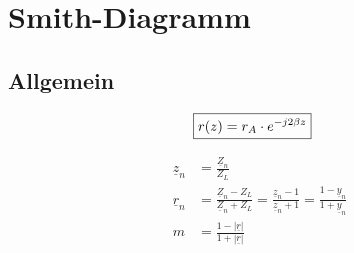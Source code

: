 \section{Smith-Diagramm}

\subsection{Allgemein}
\begin{center}
    \begin{align*}
        \Aboxed{r(z) & = r_A \cdot e^{-j2\beta z}}
    \end{align*}
    
\end{center}
\begin{align*}
    \underline{z}_n & = \frac{\underline{Z}_n}{Z_L}                                                                                                                   \\
    \underline{r}_n   & = \frac{\underline{Z}_n-Z_L}{\underline{Z}_n+Z_L}= \frac{\underline{z}_n-1}{\underline{z}_n+1}    = \frac{1-\underline{y}_n}{1+\underline{y}_n} \\
    m               & = \frac{1-|\underline{r}|}{1+|\underline{r}|}
\end{align*}